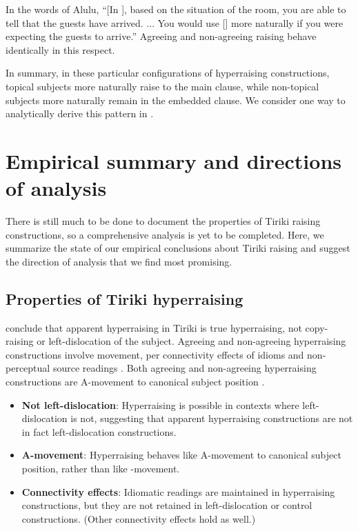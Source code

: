 \documentclass[output=paper,colorlinks,citecolor=brown
]{langscibook}
\begin{document}
\z

\noindent In the words of Alulu, ``[In ], based on the situation of the room, you are able to tell that the guests have arrived. ... You would use [] more naturally if you were expecting the guests to arrive.'' Agreeing and non-agreeing raising behave identically in this respect. %

In summary, in these particular configurations of hyperraising constructions, topical subjects more naturally raise to the main clause, while non-topical subjects more naturally remain in the embedded clause. We consider one way to analytically derive this pattern in . 

\section{Empirical summary and directions of analysis} \label{sec:johnson:analysis}

There is still much to be done to document the properties of Tiriki raising constructions, so a comprehensive analysis is yet to be completed. Here, we summarize the state of our empirical conclusions about Tiriki raising and suggest the direction of analysis that we find most promising.

\subsection{Properties of Tiriki hyperraising}

\citet{diercksetal2022luyia} conclude that apparent hyperraising in Tiriki is true hyperraising, not copy-raising or left-dislocation of the subject. Agreeing and non-agreeing hyperraising constructions involve movement, per connectivity effects of idioms and non-perceptual source readings \citep{diercksetal2022luyia}. Both agreeing and non-agreeing hyperraising constructions are A-movement to canonical subject position \citep{diercksetal2022luyia}.

\ea {} 
\begin{itemize}

\item \textbf{Not left-dislocation}: Hyperraising is possible in contexts where left-dislocation is not, suggesting that apparent hyperraising constructions are not in fact left-dislocation constructions.

\item \textbf{A-movement}: Hyperraising behaves like A-movement to canonical subject position, rather than like \abar-movement.

\item \textbf{Connectivity effects}: Idiomatic readings are maintained in hyperraising constructions, but they are not retained in left-dislocation or control constructions. (Other connectivity effects hold as well.)

\end{itemize}
\z 
\end{document}
